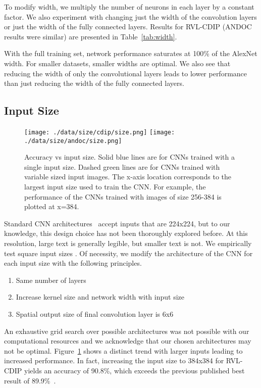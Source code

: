 \documentclass[10pt, conference, compsocconf]{IEEEtran}
\begin{document}
To modify width, we multiply the number of neurons in each layer by a constant factor.
We also experiment with changing just the width of the convolution layers or just the width of the fully connected layers.
Results for RVL-CDIP (ANDOC results were similar) are presented in Table~\ref{tab:width}.

With the full training set, network performance saturates at 100\% of the AlexNet width.
For smaller datasets, smaller widths are optimal.
We also see that reducing the width of only the convolutional layers leads to lower performance than just reducing the width of the fully connected layers.


\subsection{Input Size}

\begin{figure}

\texttt{[image: ./data/size/cdip/size.png]}
\texttt{[image: ./data/size/andoc/size.png]}

\caption{Accuracy vs input size.  Solid blue lines are for CNNs trained with a single input size. Dashed green lines are for CNNs trained with variable sized input images.  The x-axis location corresponds to the largest input size used to train the CNN.  For example, the performance of the CNNs trained with images of size 256-384 is plotted at x=384.}
\label{fig:input_size}
\end{figure}

Standard CNN architectures~\cite{krizhevsky12,simonyan14,he15residual} accept inputs that are 224x224, but to our knowledge, this design choice has not been thoroughly explored before.
At this resolution, large text is generally legible, but smaller text is not.
We empirically test square input sizes .
Of necessity, we modify the architecture of the CNN for each input size with the following principles.
\begin{enumerate}
\item Same number of layers
\item Increase kernel size and network width with input size
\item Spatial output size of final convolution layer is 6x6
\end{enumerate}
An exhaustive grid search over possible architectures was not possible with our computational resources and we acknowledge that our chosen architectures may not be optimal.
Figure~\ref{fig:input_size} shows a distinct trend with larger inputs leading to increased performance.
In fact, increasing the input size to 384x384 for RVL-CDIP yields an accuracy of 90.8\%, which exceeds the previous published best result of 89.9\%~\cite{harley15}.
\end{document}
